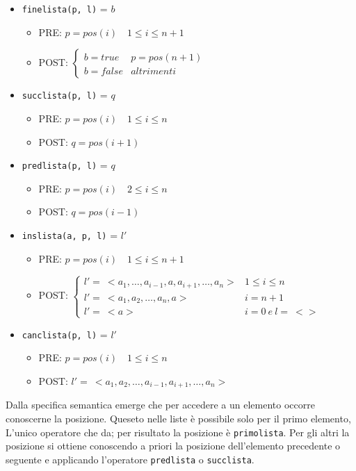 \documentclass[12pt]{report}
\begin{document}
\begin{itemize}
\begin{itemize}
			\item \texttt{finelista(p, l)} = $b$
			\begin{itemize}
				\item PRE: $p = pos(i) \quad 1 \leq i \leq n + 1$
				\item POST: $\begin{cases}
					b = true & p = pos(n + 1) \\
					b = false & altrimenti
				\end{cases}$
			\end{itemize}
			\item \texttt{succlista(p, l)} = $q$
			\begin{itemize}
				\item PRE: $p = pos(i) \quad 1 \leq i \leq n$
				\item POST: $q = pos(i + 1)$
			\end{itemize}
			\item \texttt{predlista(p, l)} = $q$
			\begin{itemize}
				\item PRE: $p = pos(i) \quad 2 \leq i \leq n$
				\item POST: $q = pos(i - 1)$
			\end{itemize}
			\item \texttt{inslista(a, p, l)} = $l'$
			\begin{itemize}
				\item PRE: $p = pos(i) \quad 1 \leq i \leq n + 1$
				\item POST: $\begin{cases}
					l' =\ <a_1, \dots, a_{i-1}, a, a_{i+1}, \dots, a_n> & 1 \leq i \leq n \\
					l' =\ <a_1, a_2, \dots, a_n, a> & i = n + 1\\
					l' =\ < a > \quad &i = 0\ e\ l =\ <>
				\end{cases}$
			\end{itemize}
			\item \texttt{canclista(p, l)} = $l'$
			\begin{itemize}
				\item PRE: $p = pos(i) \quad 1 \leq i \leq n$
				\item POST: $l' =\ <a_1, a_2, \dots, a_{i-1}, a_{i+1}, \dots,a_n>$
			\end{itemize}
		\end{itemize}
	\end{itemize}
	Dalla specifica semantica emerge che per accedere a un elemento occorre conoscerne la posizione. Queseto nelle liste è possibile solo per il primo elemento, L'unico operatore che da; per risultato la posizione è \texttt{primolista}. Per gli altri la posizione si ottiene conoscendo a priori la posizione dell'elemento precedente o seguente e applicando l'operatore \texttt{predlista} o \texttt{succlista}. \\
\end{document}
